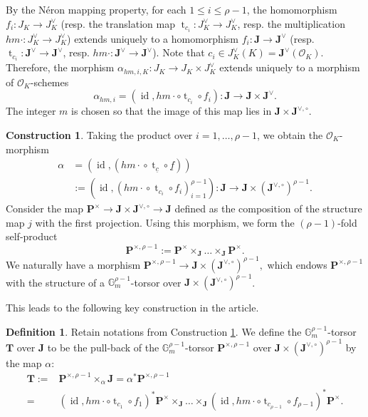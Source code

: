 \documentclass[11pt,oneside]{amsart}
\theoremstyle{plain}
\theoremstyle{definition}
\newtheorem{definition}[theorem]{Definition}
\newtheorem{construction}[theorem]{Construction}
\def\lra{{\longrightarrow}}
\def\G{{\bf G}}
\DeclareMathOperator{\id}{id} \DeclareMathOperator{\Sel}{Sel}
\DeclareMathOperator{\tr}{t}
\def\TT{\mathbf{T}}
\def\J{\mathbf{J}}
\def\Jo{\mathbf{J}^{\vee,\circ}}
\def\G{\mathbb{G}}
\def\P{\mathbf{P}}
\def\oh{\mathcal{O}}
\begin{document}
By the N\'eron mapping property, for each $1\leq i\leq \rho-1$, the homomorphism $f_i : J_K\lra J_K^\vee$ (resp. the translation map $\tr_{c_i} : J_K^\vee \lra J_K^\vee$, resp.  the multiplication $hm\cdot : J_K^\vee \lra J_K^\vee$) extends uniquely to a homomorphism  $f_i : \J\lra \J^\vee$ (resp.  $\tr_{c_i} : \J^\vee \lra \J^\vee$, resp.  $hm\cdot : \J^\vee \lra \J^\vee$).  Note that $c_i\in J_K^\vee(K) =  \J^\vee(\oh_K)$. Therefore, the morphism $\alpha_{hm, i, K} : J_K\lra J_K\times J_K^\vee$ extends uniquely to a morphism of $\oh_K$-schemes 
$$\alpha_{hm, i} = (\id, hm\cdot \circ \tr_{c_i} \circ f_i): \J\lra  \J\times \J^\vee.$$  
The integer $m$ is chosen so that the image of this map lies in $\J\times \Jo$. 

\begin{construction} \label{map:alpha} 
Taking the product over $i=1, \ldots, \rho-1$, we obtain the $\oh_K$-morphism
\begin{align*} 
    \alpha & =(\id, ({hm\cdot} \circ \tr_{\underline{c}} \circ \underline{f})) \\
    & :=(\id, ({hm\cdot} \circ \tr_{c_i} \circ f_i)_{i=1}^{\rho-1}) : \J \lra \J\times (\Jo)^{\rho-1}.
\end{align*}
Consider the map $\P^\times \rightarrow \J \times \Jo \rightarrow \J$ defined as the composition of the structure map $j$ with the first projection. Using this morphism, we form the $(\rho-1)$-fold self-product 
$$
    \P^{\times, \rho-1}:= \P^\times \times_{\J} \ldots \times_{\J} \P^\times.
$$
We naturally have a morphism
$    \P^{\times, \rho-1} \lra \J\times (\Jo)^{\rho-1},$
which endows $\P^{\times, \rho-1}$ with the structure of a $\G_m^{\rho-1}$-torsor over $\J\times (\Jo)^{\rho-1}$.
\end{construction}
 

This leads to the following key construction in the article. 
\begin{definition}Retain notations from Construction \ref{map:alpha}. We define the $\G_m^{\rho-1}$-torsor $\TT$ over $\J$ to be the pull-back of the $\G_m^{\rho-1}$-torsor $\P^{\times, \rho-1}$ over $\J\times (\Jo)^{\rho-1}$ by the map $\alpha$:
\begin{align*}
    \TT:= & \P^{\times, \rho-1}\times_{\alpha} \J=\alpha^* \P^{\times, \rho-1} \\ = &
    (\id, hm\cdot \circ \tr_{c_1} \circ f_1)^* \P^\times\times_{\J} \ldots \times_{\J}(\id, hm\cdot \circ \tr_{c_{\rho-1}} \circ f_{\rho-1})^* \P^\times.
\end{align*}
\end{definition}
\end{document}
